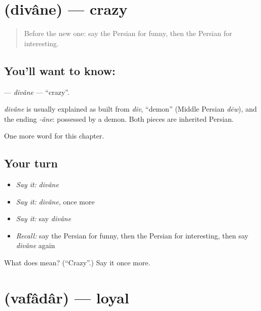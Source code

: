 \section[\texorpdfstring{\fa{دیوانه} (divâne)}{دیوانه (divâne)}]{ (divâne) — crazy}

\label{lesson:FA-C236-divane}



\begin{quote}
Before the new one: say the Persian for funny, then the Persian for interesting.
\end{quote}

\subsection*{You'll want to know: }
\textbf{} — \emph{divâne} — \textquotedblleft{}crazy\textquotedblright{}.

\begin{cousinweb}
\emph{divâne} is usually explained as built from \emph{div}, \textquotedblleft{}demon\textquotedblright{} (Middle Persian \emph{dēw}), and the ending \emph{-âne}: possessed by a demon. Both pieces are inherited Persian.
\end{cousinweb}

\begin{grammarlens}[title={What you've built}]
One more word for this chapter.
\end{grammarlens}

\subsection*{Your turn}
\begin{itemize}
\raggedright
  \item \emph{Say it:} \emph{divâne}
  \item \emph{Say it:} \emph{divâne}, once more
  \item \emph{Say it:} say \emph{divâne}
  \item \emph{Recall:} say the Persian for funny, then the Persian for interesting, then say \emph{divâne} again
\end{itemize}

\begin{tcolorbox}[breakable,colback=teal!4,colframe=teal!35!black,title={Before you move on}]
What does  mean? (\textquotedblleft{}Crazy\textquotedblright{}.) Say it once more.
\end{tcolorbox}
\section[\texorpdfstring{\fa{وفادار} (vafâdâr)}{وفادار (vafâdâr)}]{ (vafâdâr) — loyal}

